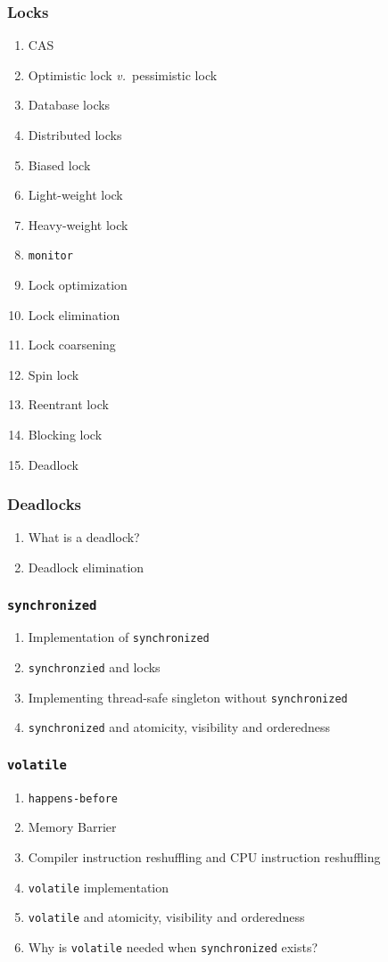 \documentclass[11pt, twocolumn]{article}
\newcommand{\versus}{\textit{v.}\ }
\begin{document}
\subsubsection{Locks}
\begin{enumerate}
	\item CAS
	\item Optimistic lock \versus pessimistic lock
	\item Database locks
	\item Distributed locks
	\item Biased lock
	\item Light-weight lock
	\item Heavy-weight lock
	\item \texttt{monitor}
	\item Lock optimization
	\item Lock elimination
	\item Lock coarsening
	\item Spin lock
	\item Reentrant lock
	\item Blocking lock
	\item Deadlock
\end{enumerate}

\subsubsection{Deadlocks}
\begin{enumerate}
	\item What is a deadlock?
	\item Deadlock elimination
\end{enumerate}

\subsubsection{\texttt{synchronized}}
\begin{enumerate}
	\item Implementation of \texttt{synchronized}
	\item \texttt{synchronzied} and locks
	\item Implementing thread-safe singleton without \texttt{synchronized}
	\item \texttt{synchronized} and atomicity, visibility and orderedness
\end{enumerate}

\subsubsection{\texttt{volatile}}
\begin{enumerate}
	\item \texttt{happens-before}
	\item Memory Barrier
	\item Compiler instruction reshuffling and CPU instruction reshuffling
	\item \texttt{volatile} implementation
	\item \texttt{volatile} and atomicity, visibility and orderedness
	\item Why is \texttt{volatile} needed when \texttt{synchronized} exists?
\end{enumerate}
\end{document}
